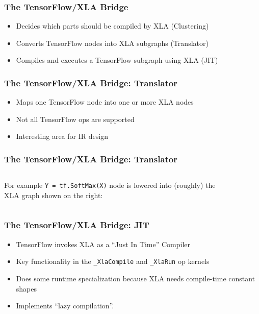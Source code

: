 \documentclass{beamer}
\newcommand{\image}[1]{\begin{figure}\fbox{\texttt{[image: ./images/\#1.pdf]}}\end{figure}}
\begin{document}
\begin{frame}[fragile]
\frametitle{The TensorFlow/XLA Bridge}
  \begin{itemize}
  \item Decides which parts should be compiled by XLA (Clustering)
  \item Converts TensorFlow nodes into XLA subgraphs (Translator)
  \item Compiles and executes a TensorFlow subgraph using XLA (JIT)
  \end{itemize}
\end{frame}


\begin{frame}[fragile]
\frametitle{The TensorFlow/XLA Bridge: Translator}
  \begin{itemize}
  \item Maps one TensorFlow node into one or more XLA nodes
  \item Not all TensorFlow ops are supported
  \item Interesting area for IR design
  \end{itemize}
\end{frame}


\begin{frame}[fragile]
\frametitle{The TensorFlow/XLA Bridge: Translator}
  \begin{columns}
    \begin{column}{0.48\textwidth}
      For example \texttt{Y = tf.SoftMax(X)} node is lowered into (roughly) the XLA graph shown on the right:
    \end{column}
    \begin{column}{0.48\textwidth}
      \image{softmax-lowering}
    \end{column}
  \end{columns}
\end{frame}


\begin{frame}[fragile]
  \frametitle{The TensorFlow/XLA Bridge: JIT}
  \begin{itemize}
  \item TensorFlow invokes XLA as a ``Just In Time'' Compiler
  \item Key functionality in the \texttt{\_XlaCompile} and \texttt{\_XlaRun} op kernels
  \item Does some runtime specialization because XLA needs compile-time constant shapes
  \item Implements ``lazy compilation''.
  \end{itemize}
\end{frame}
\end{document}
